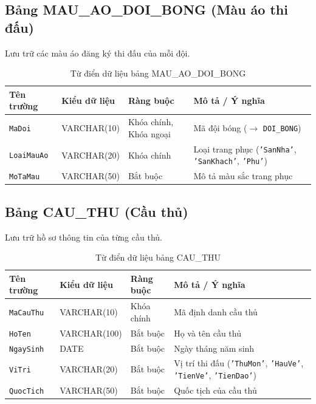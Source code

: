 \subsection{Bảng MAU\_AO\_DOI\_BONG (Màu áo thi đấu)}
Lưu trữ các màu áo đăng ký thi đấu của mỗi đội.
\begin{table}[H]
\centering
\small
\begin{tabular}{|l|l|l|p{6cm}|}
\hline
\textbf{Tên trường} & \textbf{Kiểu dữ liệu} & \textbf{Ràng buộc} & \textbf{Mô tả / Ý nghĩa} \\ \hline
\texttt{MaDoi} & VARCHAR(10) & Khóa chính, Khóa ngoại & Mã đội bóng ($\rightarrow$ \texttt{DOI\_BONG}) \\ \hline
\texttt{LoaiMauAo} & VARCHAR(20) & Khóa chính & Loại trang phục (\texttt{'SanNha'}, \texttt{'SanKhach'}, \texttt{'Phu'}) \\ \hline
\texttt{MoTaMau} & VARCHAR(50) & Bắt buộc & Mô tả màu sắc trang phục \\ \hline
\end{tabular}
\caption{Từ điển dữ liệu bảng MAU\_AO\_DOI\_BONG}
\end{table}

\subsection{Bảng CAU\_THU (Cầu thủ)}
Lưu trữ hồ sơ thông tin của từng cầu thủ.
\begin{table}[H]
\centering
\small
\begin{tabular}{|l|l|l|p{6cm}|}
\hline
\textbf{Tên trường} & \textbf{Kiểu dữ liệu} & \textbf{Ràng buộc} & \textbf{Mô tả / Ý nghĩa} \\ \hline
\texttt{MaCauThu} & VARCHAR(10) & Khóa chính & Mã định danh cầu thủ \\ \hline
\texttt{HoTen} & VARCHAR(100) & Bắt buộc & Họ và tên cầu thủ \\ \hline
\texttt{NgaySinh} & DATE & Bắt buộc & Ngày tháng năm sinh \\ \hline
\texttt{ViTri} & VARCHAR(20) & Bắt buộc & Vị trí thi đấu (\texttt{'ThuMon'}, \texttt{'HauVe'}, \texttt{'TienVe'}, \texttt{'TienDao'}) \\ \hline
\texttt{QuocTich} & VARCHAR(50) & Bắt buộc & Quốc tịch của cầu thủ \\ \hline
\end{tabular}
\caption{Từ điển dữ liệu bảng CAU\_THU}
\end{table}

